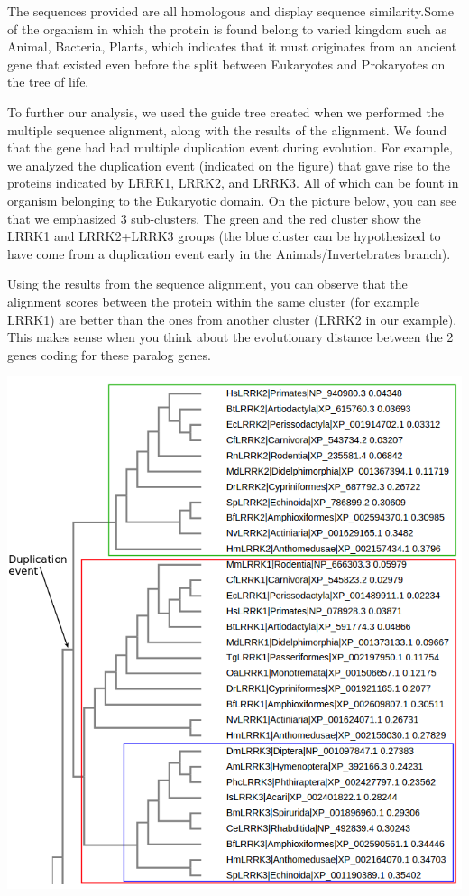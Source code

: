 \documentclass[11pt, a4paper,titlepage]{article}
\begin{document}
The sequences provided are all homologous and display sequence
similarity.Some of the organism in which the protein is found belong
to varied kingdom such as Animal, Bacteria, Plants, which indicates
that it must originates from an ancient gene that existed even before
the split between Eukaryotes and Prokaryotes on the tree of life.

To further our analysis, we used the guide tree created when we
performed the multiple sequence alignment, along with the results of
the alignment. We found that the gene had had multiple duplication
event during evolution. For example, we analyzed the duplication event
(indicated on the figure) that gave rise to the proteins indicated by
LRRK1, LRRK2, and LRRK3. All of which can be fount in organism
belonging to the Eukaryotic domain. On the picture below, you can see
that we emphasized 3 sub-clusters. The green and the red cluster show
the LRRK1 and LRRK2+LRRK3 groups (the blue cluster can be hypothesized
to have come from a duplication event early in the
Animals/Invertebrates branch).

Using the results from the sequence alignment, you can observe that
the alignment scores between the protein within the same cluster (for
example LRRK1) are better than the ones from another cluster (LRRK2 in
our example). This makes sense when you think about the evolutionary
distance between the 2 genes coding for these paralog genes.

\includegraphics[width=17cm]{./Figures/5e.png}
\end{document}
